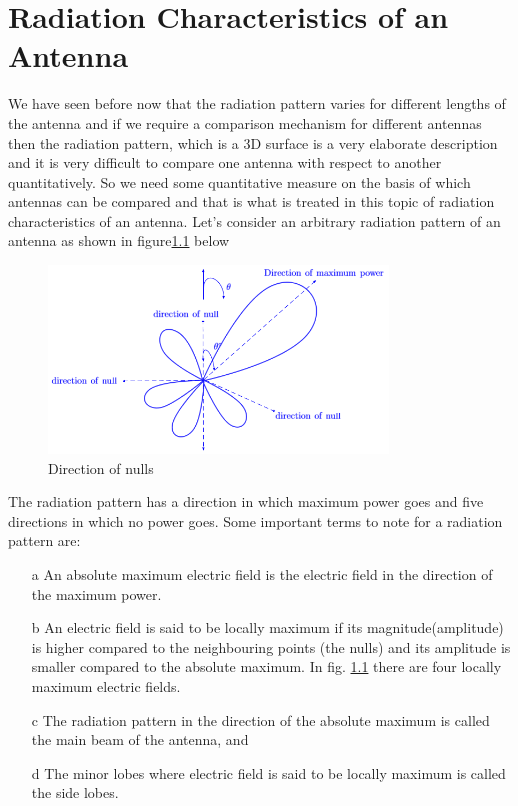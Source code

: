 \chapter{Radiation Characteristics of an Antenna}
We have seen before now that the radiation pattern varies for different lengths of the antenna and if we require a comparison mechanism for different antennas then the radiation pattern, which is a 3D surface is a very elaborate description and it is very difficult to compare one antenna with respect to another quantitatively. So we need some quantitative measure on the basis of which antennas can be compared and that is what is treated in this topic of radiation characteristics of an antenna.
Let's consider an arbitrary radiation pattern of an antenna as shown in figure\ref{figure8} below

\begin{figure}[h]
\centering
\includegraphics[height=5cm]{"./graphics/maximum null"}
\caption{Direction of nulls}
\label{figure8}
\end{figure}


The radiation pattern has a direction in which maximum power goes and five directions in which no power goes. Some important terms to note for a radiation pattern are:
\begin{enumerate}
\item [a]	An absolute maximum electric field is the electric field in the direction of the maximum power.
\item [b]	An electric field is said to be locally maximum if its magnitude(amplitude) is higher compared to the neighbouring points (the nulls) and its amplitude is smaller compared to the absolute maximum. In fig. \ref{figure8} there are four locally maximum electric fields.
\item [c]	The radiation pattern in the direction of the absolute maximum is called the main beam of the antenna, and
\item [d] 	The minor lobes where electric field is said to be locally maximum is called the side lobes.
\end{enumerate}

